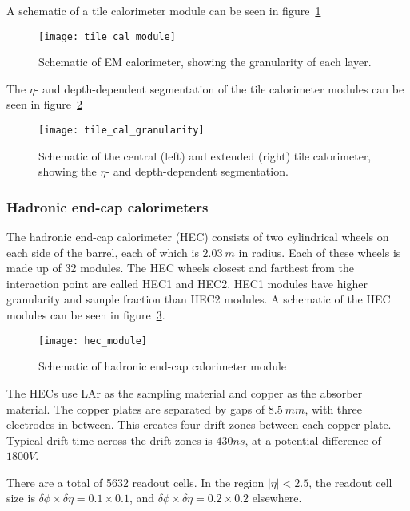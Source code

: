 A schematic of a tile calorimeter module can be seen in figure~\ref{fig:tile_cal_module}

\begin{figure}[!ht]\centering
\texttt{[image: tile\_cal\_module]}
\caption{Schematic of EM calorimeter, showing the granularity of each layer.}
\label{fig:tile_cal_module}\cite{atlas-detector-2008}
\end{figure}

The $\eta$- and depth-dependent segmentation of the tile calorimeter modules can be seen in figure~\ref{fig:tile_cal_granularity}

\begin{figure}[!ht]\centering
\texttt{[image: tile\_cal\_granularity]}
\caption{Schematic of the central (left) and extended (right) tile calorimeter, showing the $\eta$- and depth-dependent segmentation.}
\label{fig:tile_cal_granularity}\cite{atlas-detector-2008}
\end{figure}

\subsubsection{Hadronic end-cap calorimeters}

The hadronic end-cap calorimeter (HEC) consists of two cylindrical wheels on each side of the barrel,
each of which is $2.03~m$ in radius.
Each of these wheels is made up of 32 modules.
The HEC wheels closest and farthest from the interaction point are called HEC1 and HEC2.
HEC1 modules have higher granularity and sample fraction than HEC2 modules.
A schematic of the HEC modules can be seen in figure~\ref{fig:hec_module}.

\begin{figure}[!ht]\centering
\texttt{[image: hec\_module]}
\caption{Schematic of hadronic end-cap calorimeter module}
\label{fig:hec_module}\cite{atlas-detector-2008}
\end{figure}

The HECs use LAr as the sampling material and copper as the absorber material.
The copper plates are separated by gaps of $8.5~mm$, with three electrodes in between.
This creates four drift zones between each copper plate.
Typical drift time across the drift zones is $430 ns$, at a potential difference of $1800 V$.\cite{atlas-detector-2008}

There are a total of 5632 readout cells.
In the region $|\eta| < 2.5$, the readout cell size is $\delta\phi \times \delta\eta = 0.1 \times 0.1$, and $\delta\phi \times \delta\eta = 0.2 \times 0.2$ elsewhere.

